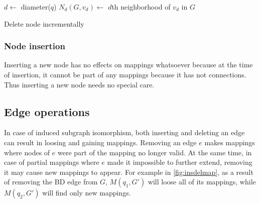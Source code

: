 \begin{algorithm}[htp]
    \SetAlgoLined\DontPrintSemicolon
    \nl $d \gets $ diameter($q$)\;
    \nl $N_d(G, v_d) \gets$ $d$th neighborhood of $v_d$ in $G$\;
    \caption{Delete node incrementally}
\end{algorithm}

\subsubsection{Node insertion}

Inserting a new node has no effects on mappings whatsoever because at the time of insertion,
it cannot be part of any mappings because it has not connections. Thus inserting a new node
needs no special care.

\subsection{Edge operations}

In case of induced subgraph isomorphism, both inserting and deleting an edge can result 
in loosing and gaining mappings. Removing an edge $e$ makes mappings where nodes of $e$
were part of the mapping no longer valid. At the same time, in case of partial mappings
where $e$ made it impossible to further extend, removing it may cause new mappings to
appear. For example in \ref{fig:insdelmap}, as a result of removing the BD edge from $G$,
$M(q_1, G')$ will loose all of its mappings, while $M(q_2, G')$ will find only new mappings. 

